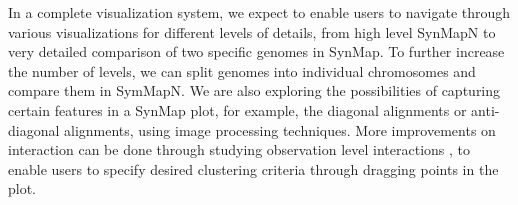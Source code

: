 \documentclass{vgtc}                      %
\begin{document}


  
In a complete visualization system, we expect to enable users to navigate through various visualizations for different levels of details, from high level SynMapN to very detailed comparison of two specific genomes in SynMap. To further increase the number of levels, we can split genomes into individual chromosomes and compare them in SymMapN. We are also exploring the possibilities of capturing certain features in a SynMap plot, for example, the diagonal alignments or anti-diagonal alignments, using image processing techniques. More improvements on interaction can be done through studying observation level interactions \cite{endert2011observation}, to enable users to specify desired clustering criteria through dragging points in the plot. 





%

%
%
%


\end{document}

